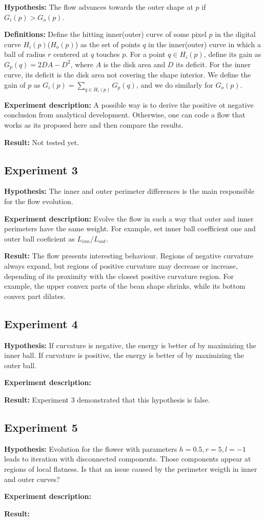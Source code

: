 \textbf{Hypothesis:} The flow advances towards the outer shape at $p$ if $G_i(p) > G_o(p)$.


\textbf{Definitions:} Define the hitting inner(outer) curve of some pixel $p$ in the digital curve $H_i(p)$($H_o(p)$) as the set of points  $q$ in the inner(outer) curve in which a ball of radius $r$ centered at $q$ touches $p$. For a point $q \in H_i(p)$, define its gain as $G_{p}(q) = 2DA - D^2$, where $A$ is the disk area and $D$ its deficit. For the inner curve, its deficit is the disk area not covering the shape interior. We define the gain of $p$ as $G_i(p) = \sum_{q \in H_i(p)} G_p(q)$, and we do similarly for $G_o(p)$. 


\textbf{Experiment description:} A possible way is to derive the positive ot negative conclusion from analytical development. Otherwise, one can code a flow that works as its proposed here and then compare the results.


\textbf{Result:} Not tested yet.


\subsection{Experiment 3}

\textbf{Hypothesis:} The inner and outer perimeter differences is the main responsible for the flow evolution.

\textbf{Experiment description:} Evolve the flow in such a way that outer and inner perimeters have the same weight. For example, set inner ball coefficient one and outer  ball coeficient as $L_{inn}/L_{out}$.

\textbf{Result:} The flow presents interesting behaviour. Regions of negative curvature always expand, but regions of positive curvature may decrease or increase, depending of its proximity with the closest positive curvature region. For example, the upper convex parts of the bean shape shrinks, while its bottom convex part dilates.


\subsection{Experiment 4}

\textbf{Hypothesis:} If curvature is negative, the energy is better of by maximizing the inner ball. If curvature is positive, the energy is  better of by maximizing the outer ball.


\textbf{Experiment description:}


\textbf{Result:} Experiment 3 demonstrated that this hypothesis is false.



\subsection{Experiment 5}

\textbf{Hypothesis:} Evolution for the flower with parameters $h=0.5,r=5,l=-1$ leads to iteration with disconnected components. Those components appear at regions of local flatness. Is that an issue caused by the perimeter weigth in inner and outer curves?


\textbf{Experiment description:}


\textbf{Result:}